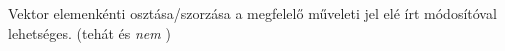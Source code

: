 Vektor elemenkénti osztása/szorzása a megfelelő műveleti jel elé írt  módosítóval lehetséges. 
(tehát  és {\it nem} )
